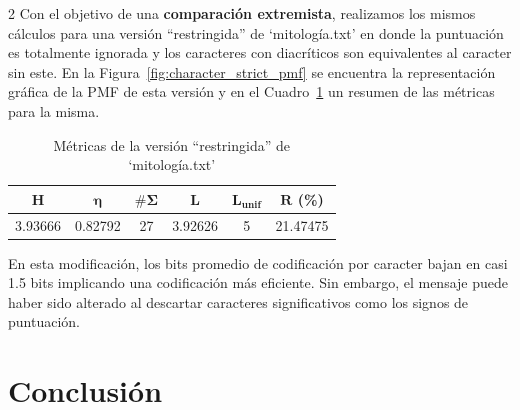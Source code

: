 \documentclass[a4paper, 10pt]{article}
\begin{document}
\begin{multicols}{2}
    Con el objetivo de una \textbf{comparación extremista}, realizamos los mismos cálculos para una versión ``restringida'' de `mitología.txt' en donde la puntuación es totalmente ignorada y los caracteres con diacríticos son equivalentes al caracter sin este. En la Figura~\ref{fig:character_strict_pmf} se encuentra la representación gráfica de la PMF de esta versión y en el Cuadro~\ref{tab:restringed_metrics} un resumen de las métricas para la misma.

    \begin{table}[H]
        \centering
        \footnotesize
        \begin{tabular}{cccccc}
            \toprule
            $\boldsymbol{H}$ & 
            $\boldsymbol{\eta}$ & 
            $\boldsymbol{\#\Sigma}$ & 
            $\boldsymbol{L}$ & 
            $\boldsymbol{L_{\text{unif}}}$ & 
            $\boldsymbol{R}$ (\%)  
            \\
            \midrule
            3.93666 & 0.82792 & 27 & 3.92626 & 5 & 21.47475 \\
            \bottomrule
        \end{tabular}
        \caption{Métricas de la versión ``restringida'' de `mitología.txt'}
        \label{tab:restringed_metrics}
    \end{table}

    En esta modificación, los bits promedio de codificación por caracter bajan en casi 1.5 bits implicando una codificación más eficiente. Sin embargo, el mensaje puede haber sido alterado al descartar caracteres significativos como los signos de puntuación. 
    
\end{multicols}

\vfill

\newpage


\section{Conclusión}
\end{document}
